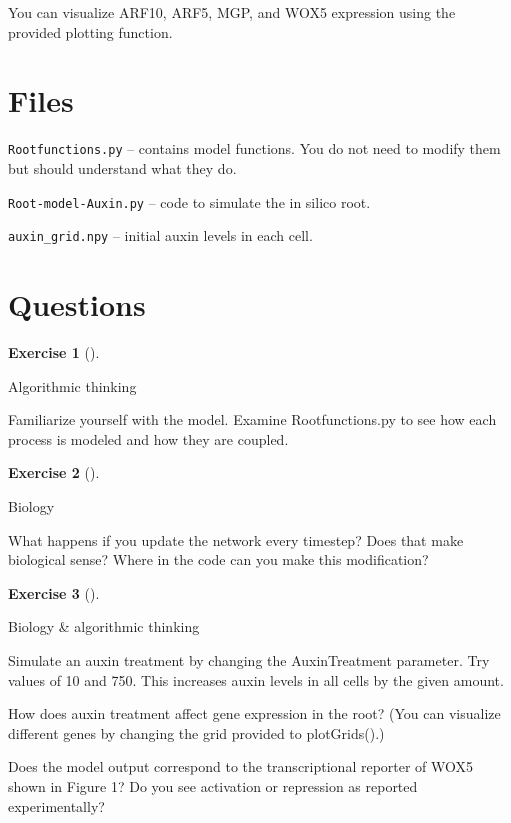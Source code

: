 \documentclass[
  letterpaper,
  DIV=11,
  numbers=noendperiod]{scrreprt}
\theoremstyle{definition}
\newtheorem{exercise}{Exercise}[chapter]
\theoremstyle{remark}
\begin{document}
You can visualize ARF10, ARF5, MGP, and WOX5 expression using the
provided plotting function.

\section{Files}\label{files}

\texttt{Rootfunctions.py} -- contains model functions. You do not need
to modify them but should understand what they do.

\texttt{Root-model-Auxin.py} -- code to simulate the in silico root.

\texttt{auxin\_grid.npy} -- initial auxin levels in each cell.

\section{Questions}\label{questions-2}

\begin{exercise}[]\protect\hypertarget{exr-tur}{}\label{exr-tur}

Algorithmic thinking

Familiarize yourself with the model. Examine Rootfunctions.py to see how
each process is modeled and how they are coupled.

\end{exercise}

\begin{exercise}[]\protect\hypertarget{exr-tur}{}\label{exr-tur}

Biology

What happens if you update the network every timestep? Does that make
biological sense? Where in the code can you make this modification?

\end{exercise}

\begin{exercise}[]\protect\hypertarget{exr-tur}{}\label{exr-tur}

Biology \& algorithmic thinking

Simulate an auxin treatment by changing the AuxinTreatment parameter.
Try values of 10 and 750. This increases auxin levels in all cells by
the given amount.

How does auxin treatment affect gene expression in the root? (You can
visualize different genes by changing the grid provided to plotGrids().)

Does the model output correspond to the transcriptional reporter of WOX5
shown in Figure 1? Do you see activation or repression as reported
experimentally?

\end{exercise}
\end{document}
